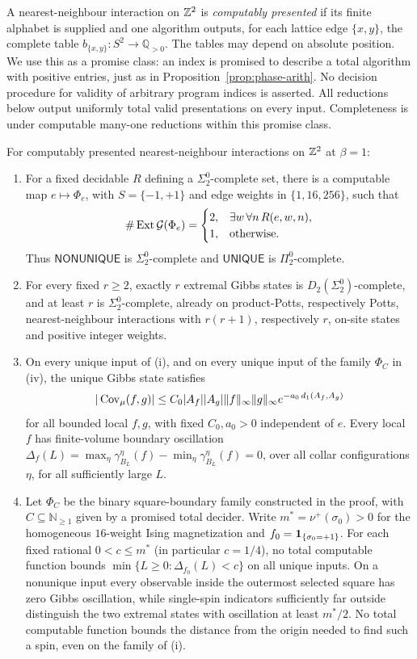 A nearest-neighbour interaction on $\mathbb Z^2$ is \emph{computably presented}
if its finite alphabet is supplied and one algorithm outputs, for each lattice
edge $\{x,y\}$, the complete table
$b_{\{x,y\}}:S^2\to\mathbb Q_{>0}$. The tables may depend on absolute position.
We use this as a promise class: an index is promised to describe a total
algorithm with positive entries, just as in Proposition~\ref{prop:phase-arith}.
No decision procedure for validity of arbitrary program indices is asserted.
All reductions below output uniformly total valid presentations on every input.
Completeness is under computable many-one reductions within this promise class.

\begin{theorem}\label{thm:cp-sharp}
For computably presented nearest-neighbour interactions on $\mathbb Z^2$ at $\beta=1$:
\begin{enumerate}[label=(\roman*)]
\item For a fixed decidable $R$ defining a $\Sigma^0_2$-complete set, there is a
computable map $e\mapsto\Phi_e$, with $S=\{-1,+1\}$ and edge weights in
$\{1,16,256\}$, such that
\[
 \#\operatorname{Ext}\mathcal G(\Phi_e)=
 \begin{cases}2,&\exists w\,\forall n\,R(e,w,n),\\1,&\text{otherwise}.\end{cases}
\]
Thus $\mathsf{NONUNIQUE}$ is $\Sigma^0_2$-complete and $\mathsf{UNIQUE}$ is
$\Pi^0_2$-complete.
\item For every fixed $r\ge2$, exactly $r$ extremal Gibbs states is
$D_2(\Sigma^0_2)$-complete, and at least $r$ is $\Sigma^0_2$-complete,
already on product-Potts, respectively Potts, nearest-neighbour interactions
with $r(r+1)$, respectively $r$, on-site states and positive integer weights.
\item On every unique input of (i), and on every unique input of the family $\Phi_C$ in (iv), the unique Gibbs state satisfies
\[
 |\operatorname{Cov}_\mu(f,g)|\le C_0|A_f||A_g|\|f\|_\infty\|g\|_\infty
 e^{-a_0\,d_1(A_f,A_g)}
\]
for all bounded local $f,g$, with fixed $C_0,a_0>0$ independent of $e$.
Every local $f$ has finite-volume boundary oscillation
$\Delta_f(L)=\max_\eta\gamma^\eta_{B_L}(f)-\min_\eta\gamma^\eta_{B_L}(f)=0$,
over all collar configurations $\eta$, for all sufficiently large $L$.
\item Let $\Phi_C$ be the binary square-boundary family constructed in the
proof, with $C\subseteq\mathbb N_{\ge1}$ given by a promised total decider.
Write $m^*=\nu^+(\sigma_0)>0$ for the homogeneous $16$-weight Ising magnetization
and $f_0=\mathbf 1_{\{\sigma_0=+1\}}$. For each fixed rational $0<c\le m^*$
(in particular $c=1/4$), no total computable function bounds
$\min\{L\ge0:\Delta_{f_0}(L)<c\}$ on all unique inputs.
On a nonunique input every observable inside the outermost selected square
has zero Gibbs oscillation, while single-spin indicators sufficiently far
outside distinguish the two extremal states with oscillation at least $m^*/2$.
No total computable function bounds the distance from the origin needed to
find such a spin, even on the family of (i).
\end{enumerate}
\end{theorem}

